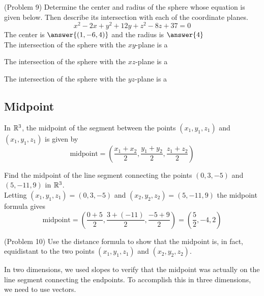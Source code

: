 \documentclass[handout]{ximera}
\begin{document}
\begin{problem}(Problem 9)
Determine the center and radius of the sphere whose equation is given below.  
Then describe its intersection with each of the coordinate planes.
\[
x^2 - 2x + y^2 + 12y + z^2 - 8z +37 = 0
\]
The center is $\answer{(1, -6, 4)}$ and the radius is $\answer{4}$\\
The intersection of the sphere with the $xy$-plane is a 
\begin{multipleChoice}
\end{multipleChoice}

The intersection of the sphere with the $xz$-plane is a 
\begin{multipleChoice}
\end{multipleChoice}

The intersection of the sphere with the $yz$-plane is a 
\begin{multipleChoice}
\end{multipleChoice}

\end{problem}


\subsection{Midpoint}
In $\mathbb R^3$, the midpoint of the segment between the points $(x_1, y_1, z_1)$ and $(x_1, y_1, z_1)$ is given by 
\[
\text{midpoint} = \left(\frac{x_1 + x_2}{2}, \frac{y_1 + y_2}{2}, \frac{z_1 + z_2}{2}\right)
\]

\begin{example}[Example 10]
Find the midpoint of the line segment connecting the points $(0,3,-5)$ and $(5,-11,9)$ in $\mathbb R^3$.\\
Letting $(x_1, y_1, z_1) = (0,3,-5)$ and $(x_2, y_2, z_2) = (5,-11,9)$ the midpoint formula gives
\[
\text{midpoint} = \left(\frac{0+5}{2}, \frac{3+(-11)}{2}, \frac{-5+9}{2}\right) = \left(\frac{5}{2}, -4,2\right)
\]
\end{example}

\begin{problem}(Problem 10)
Use the distance formula to show that the midpoint is, in fact, 
equidistant to the two points $(x_1, y_1, z_1)$ and $(x_2, y_2, z_2)$.
\end{problem}

In two dimensions, we used slopes to verify that the midpoint was actually on the line segment connecting the endpoints.  
To accomplish this in three dimensions, we need to use vectors.
\end{document}
